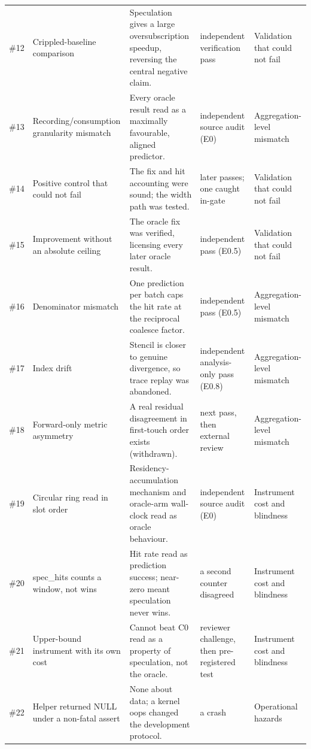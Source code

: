 \begin{tabular}{@{}rp{2.3cm}p{4.2cm}p{2.2cm}p{2.2cm}@{}}
\#12 & Crippled-baseline comparison & Speculation gives a large oversubscription speedup, reversing the central negative claim. & independent verification pass & Validation that could not fail \\ %
\#13 & Recording/consumption granularity mismatch & Every oracle result read as a maximally favourable, aligned predictor. & independent source audit (E0) & Aggregation-level mismatch \\ %
\#14 & Positive control that could not fail & The fix and hit accounting were sound; the width path was tested. & later passes; one caught in-gate & Validation that could not fail \\ %
\#15 & Improvement without an absolute ceiling & The oracle fix was verified, licensing every later oracle result. & independent pass (E0.5) & Validation that could not fail \\ %
\#16 & Denominator mismatch & One prediction per batch caps the hit rate at the reciprocal coalesce factor. & independent pass (E0.5) & Aggregation-level mismatch \\ %
\#17 & Index drift & Stencil is closer to genuine divergence, so trace replay was abandoned. & independent analysis-only pass (E0.8) & Aggregation-level mismatch \\ %
\#18 & Forward-only metric asymmetry & A real residual disagreement in first-touch order exists (withdrawn). & next pass, then external review & Aggregation-level mismatch \\ %
\#19 & Circular ring read in slot order & Residency-accumulation mechanism and oracle-arm wall-clock read as oracle behaviour. & independent source audit (E0) & Instrument cost and blindness \\ %
\#20 & spec\_hits counts a window, not wins & Hit rate read as prediction success; near-zero meant speculation never wins. & a second counter disagreed & Instrument cost and blindness \\ %
\#21 & Upper-bound instrument with its own cost & Cannot beat C0 read as a property of speculation, not the oracle. & reviewer challenge, then pre-registered test & Instrument cost and blindness \\ %
\#22 & Helper returned NULL under a non-fatal assert & None about data; a kernel oops changed the development protocol. & a crash & Operational hazards \\ %

\end{tabular}
